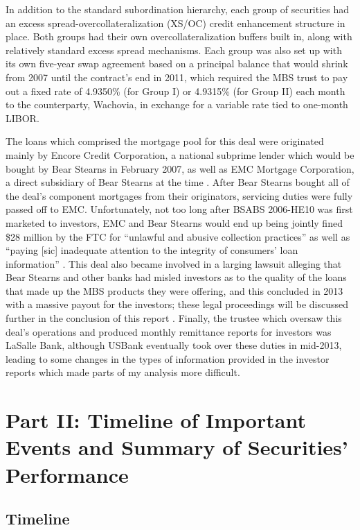 \documentclass[12pt]{article}
\begin{document}
In addition to the standard subordination hierarchy, each group of securities had an excess spread-overcollateralization (XS/OC) credit enhancement structure in place. Both groups had their own overcollateralization buffers built in, along with relatively standard excess spread mechanisms. Each group was also set up with its own five-year swap agreement based on a principal balance that would shrink from 2007 until the contract’s end in 2011, which required the MBS trust to pay out a fixed rate of 4.9350\% (for Group I) or 4.9315\% (for Group II) each month to the counterparty, Wachovia, in exchange for a variable rate tied to one-month LIBOR.

The loans which comprised the mortgage pool for this deal were originated mainly by Encore Credit Corporation, a national subprime lender which would be bought by Bear Stearns in February 2007, as well as EMC Mortgage Corporation, a direct subsidiary of Bear Stearns at the time \parencite{cpi09}.  After Bear Stearns bought all of the deal’s component mortgages from their originators, servicing duties were fully passed off to EMC. Unfortunately, not too long after BSABS 2006-HE10 was first marketed to investors, EMC and Bear Stearns would end up being jointly fined \$28 million by the FTC for “unlawful and abusive collection practices” as well as “paying [sic] inadequate attention to the integrity of consumers’ loan information” \parencite{ftc08}. This deal also became involved in a larging lawsuit alleging that Bear Stearns and other banks had misled investors as to the quality of the loans that made up the MBS products they were offering, and this concluded in 2013 with a massive payout for the investors; these legal proceedings will be discussed further in the conclusion of this report \parencite{doj13}. Finally, the trustee which oversaw this deal’s operations and produced monthly remittance reports for investors was LaSalle Bank, although USBank eventually took over these duties in mid-2013, leading to some changes in the types of information provided in the investor reports which made parts of my analysis more difficult.

\section*{Part II: Timeline of Important Events and Summary of Securities' Performance}

\subsection*{Timeline}
\end{document}

